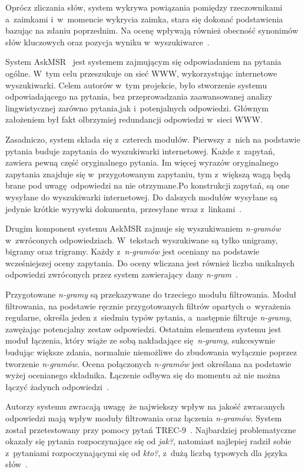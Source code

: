 Oprócz zliczania słów, system wykrywa powiązania pomiędzy rzeczownikami a~zaimkami i~w~momencie wykrycia zaimka, stara się dokonać podstawienia bazując na zdaniu poprzednim. Na ocenę wpływają również obecność synonimów słów kluczowych oraz pozycja wyniku w~wyszukiwarce~\cite{zheng2002answerbus}.

System AskMSR~\cite{brill2002analysis} jest systemem zajmującym się odpowiadaniem na pytania ogólne. W~tym celu przeszukuje on sieć WWW, wykorzystując internetowe wyszukiwarki. Celem autorów w~tym projekcie, było stworzenie systemu odpowiadającego na pytania, bez przeprowadzania zaawansowanej analizy lingwistycznej zarówno pytania,jak i~potenjalnych odpowiedzi. Głównym założeniem był fakt olbrzymiej redundancji odpowiedzi w~sieci WWW.

Zasadniczo, system składa się z~czterech modułów. Pierwszy z~nich na podstawie pytania buduje zapytania do wyszukiwarki internetowej. Każde z~zapytań, zawiera pewną część oryginalnego pytania. Im więcej wyrazów oryginalnego zapytania znajduje się w~przygotowanym zapytaniu, tym z~większą wagą będą brane pod uwagę odpowiedzi na nie otrzymane.Po konstrukcji zapytań, są one wysyłane do wyszukiwarki internetowej. Do dalszych modułów wysyłane są jedynie krótkie wyrywki dokumentu, przesyłane wraz z~linkami~\cite{brill2002analysis}.

Drugim komponent systemu AskMSR zajmuje się wyszukiwaniem \emph{n-gramów} w~zwróconych odpowiedziach. W~tekstach wyszukiwane są tylko unigramy, bigramy oraz trigramy. Każdy z~\emph{n-gramów} jest oceniany na podstawie wcześniejszej oceny zapytania. Do oceny wliczana jest również liczba unikalnych odpowiedzi zwróconych przez system zawierający dany \emph{n-gram}~\cite{brill2002analysis}.

Przygotowane \emph{n-gramy} są przekazywane do trzeciego modułu filtrowania. Moduł filtrowania, na podstawie ręcznie przygotowanych filtrów opartych o~wyrażenia regularne, określa jeden z~siedmiu typów pytania, a~następnie filtruje \emph{n-gramy}, zawężając potencjalny zestaw odpowiedzi. Ostatnim elementem systemu jest moduł łączenia, który wiąże ze sobą nakładające się \emph{n-gramy}, sukcesywnie budując większe zdania, normalnie niemożliwe do zbudowania wyłącznie poprzez tworzenie \emph{n-gramów}. Ocena połączonych \emph{n-gramów} jest określana na podstawie wyżej ocenianego składnika. Łączenie odbywa się do momentu aż nie można łączyć żadynch odpowiedzi~\cite{brill2002analysis}.

Autorzy systemu zwracają uwagę że najwiekszy wpływ na jakość zwracanych odpowiedzi mają wpływ moduły filtrowania oraz łączenia \emph{n-gramów}. System został przetestowany przy pomocy pytań TREC-9~\cite{voorhees2001trec}. Najbardziej problematyczne okazały się pytania rozpoczynające się od \emph{jak?}, natomiast najlepiej radził sobie z~pytaniami rozpoczynającymi się od \emph{kto?}, z~dużą liczbą typowych dla języka słów~\cite{brill2002analysis}.

